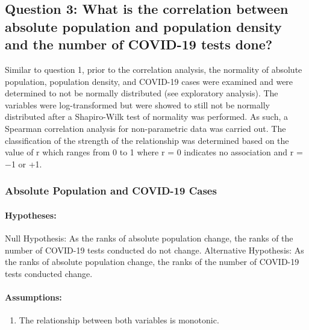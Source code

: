 \documentclass[
  12pt,
]{article}
\providecommand{\tightlist}{%
  \setlength{\itemsep}{0pt}\setlength{\parskip}{0pt}}
\begin{document}
\hypertarget{question-3-what-is-the-correlation-between-absolute-population-and-population-density-and-the-number-of-covid-19-tests-done}{%
\subsection{Question 3: What is the correlation between absolute
population and population density and the number of COVID-19 tests
done?}\label{question-3-what-is-the-correlation-between-absolute-population-and-population-density-and-the-number-of-covid-19-tests-done}}

Similar to question 1, prior to the correlation analysis, the normality
of absolute population, population density, and COVID-19 cases were
examined and were determined to not be normally distributed (see
exploratory analysis). The variables were log-transformed but were
showed to still not be normally distributed after a Shapiro-Wilk test of
normality was performed. As such, a Spearman correlation analysis for
non-parametric data was carried out. The classification of the strength
of the relationship was determined based on the value of r which ranges
from 0 to 1 where r = 0 indicates no association and r = −1 or +1.

\hypertarget{absolute-population-and-covid-19-cases-1}{%
\subsubsection{Absolute Population and COVID-19
Cases}\label{absolute-population-and-covid-19-cases-1}}

\hypertarget{hypotheses-3}{%
\paragraph{Hypotheses:}\label{hypotheses-3}}

Null Hypothesis: As the ranks of absolute population change, the ranks
of the number of COVID-19 tests conducted do not change. Alternative
Hypothesis: As the ranks of absolute population change, the ranks of the
number of COVID-19 tests conducted change.

\hypertarget{assumptions-3}{%
\paragraph{Assumptions:}\label{assumptions-3}}

\begin{enumerate}
\def\labelenumi{\arabic{enumi}.}
\tightlist
\item
  The relationship between both variables is monotonic.
\end{enumerate}
\end{document}
